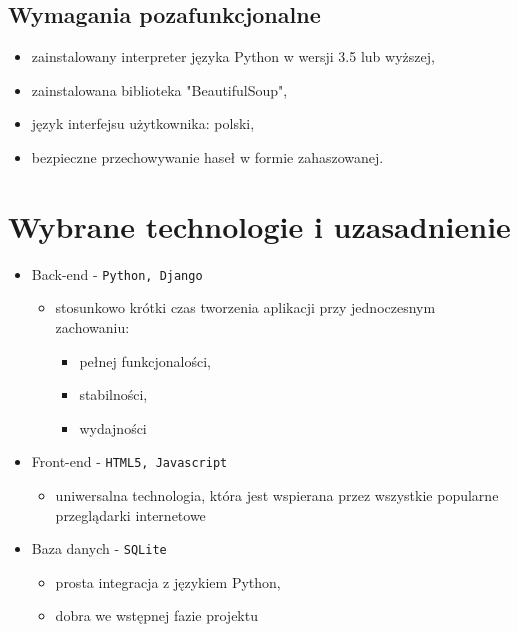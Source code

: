 \documentclass[12pt, titlepage]{article}
\begin{document}
	\subsection{Wymagania pozafunkcjonalne}
		\begin{itemize}
		\item zainstalowany interpreter języka Python w wersji 3.5 lub wyższej,
		\item zainstalowana biblioteka "BeautifulSoup",
		\item język interfejsu użytkownika: polski,
		\item bezpieczne przechowywanie haseł w formie zahaszowanej.
		\newline
		\end{itemize}

	\newpage
	\section{Wybrane technologie i uzasadnienie}
	\begin{itemize}
		\item Back-end - \texttt{Python, Django}
		\begin{itemize}
			\item stosunkowo krótki czas tworzenia aplikacji przy jednoczesnym zachowaniu: \begin{itemize}
				\item pełnej funkcjonalości,
				\item stabilności,
				\item wydajności	
			\end{itemize}
		\end{itemize}
		\item Front-end - \texttt{HTML5, Javascript}
		\begin{itemize}
			\item uniwersalna technologia, która jest wspierana przez wszystkie popularne przeglądarki internetowe
		\end{itemize}
		\item Baza danych - \texttt{SQLite}
		\begin{itemize}
			\item prosta integracja z językiem Python,
			\item dobra we wstępnej fazie projektu
		\end{itemize}
	\end{itemize}
	
\end{document}
